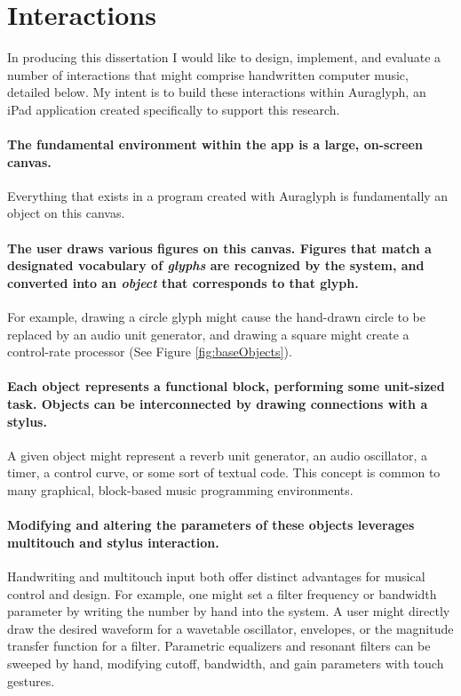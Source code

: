 \documentclass[10pt,letterpaper]{article}
\begin{document}
\section{Interactions}
\label{sec:Interactions}

In producing this dissertation I would like to design, implement, and evaluate a number of interactions that might comprise handwritten computer music, detailed below. 
My intent is to build these interactions within Auraglyph, an iPad application created specifically to support this research. 

\paragraph{The fundamental environment within the app is a large, on-screen canvas.}  Everything that exists in a program created with Auraglyph is fundamentally an object on this canvas. 

\paragraph{The user draws various figures on this canvas. 
Figures that match a designated vocabulary of \emph{glyphs} are recognized by the system, and converted into an \emph{object} that corresponds to that glyph.} 
For example, drawing a circle glyph might cause the hand-drawn circle to be replaced by an audio unit generator, and drawing a square might create a control-rate processor (See Figure \ref{fig:baseObjects}).

\paragraph{Each object represents a functional block, performing some unit-sized task.
Objects can be interconnected by drawing connections with a stylus.}
A given object might represent a reverb unit generator, an audio oscillator, a timer, a control curve, or some sort of textual code. 
This concept is common to many graphical, block-based music programming environments. 

\paragraph{Modifying and altering the parameters of these objects leverages multitouch and stylus interaction.}
Handwriting and multitouch input both offer distinct advantages for musical control and design. 
For example, one might set a filter frequency or bandwidth parameter by writing the number by hand into the system. 
A user might directly draw the desired waveform for a wavetable oscillator, envelopes, or the magnitude transfer function for a filter. 
Parametric equalizers and resonant filters can be sweeped by hand, modifying cutoff, bandwidth, and gain parameters with touch gestures. 
\end{document}
